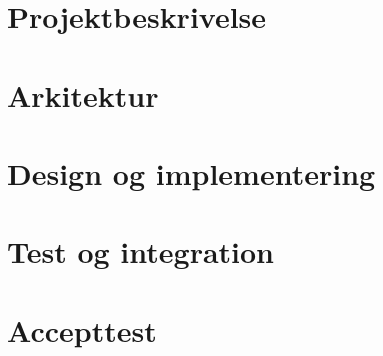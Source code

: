 \documentclass[a4paper,11pt,oneside]{memoir}
\begin{document}
		
	\frontmatter
	\pagestyle{asereport}
						\clearpage %
	\tableofcontents						\clearpage %
	
	\mainmatter
			\clearpage %
	\part{Projektbeskrivelse}	
			\clearpage %
	\part{Arkitektur}
			\clearpage %
	\part{Design og implementering}
	
	
	
	\part{Test og integration}
						\clearpage %
	\part{Accepttest}
				\clearpage %
					\clearpage %
	
	\backmatter
	\glsaddall[]
	\printnoidxglossary[title=Ordliste]		%
	
	\clearpage
	\printbibliography[title={Litteratur}] 	%
\end{document}
